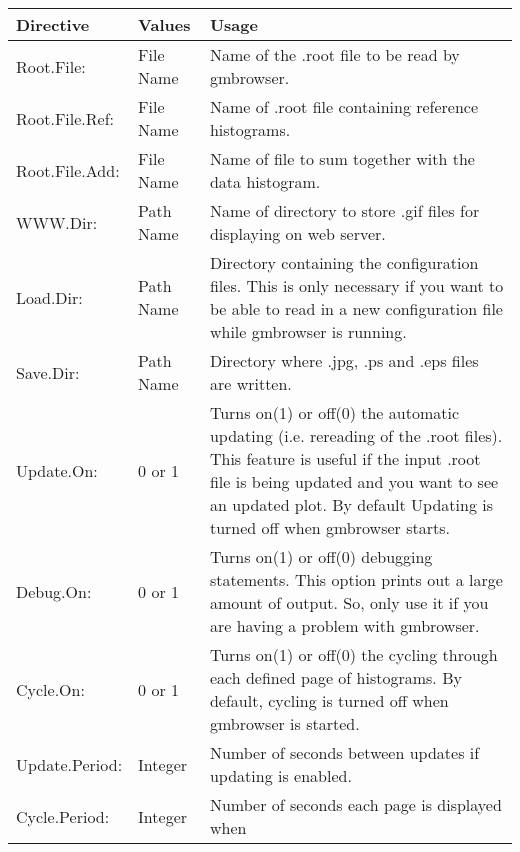 \documentclass[12pt]{article}
\begin{document}
\begin{table}
\begin{tabular}{llp{3.5in}}
\hline\hline
Directive & Values & Usage \\ \hline
  Root.File:     & File Name & Name of the .root file to be read by 
                               gmbrowser.\\
  Root.File.Ref: & File Name & Name of .root file containing reference 
                               histograms.\\
  Root.File.Add: & File Name & Name of file to sum together with the data
                               histogram.\\
  WWW.Dir:       & Path Name & Name of directory to store .gif files for 
      displaying on web server.\\
  Load.Dir:      & Path Name & Directory containing the configuration files.
                               This is only necessary if you want to be 
                               able to read in a new configuration file 
                               while gmbrowser is running.\\
  Save.Dir:      & Path Name & Directory where .jpg, .ps and .eps files 
                               are written.\\
  Update.On:     & 0 or 1    & Turns on(1) or off(0) the automatic 
                               updating (i.e. rereading of the .root files). 
                               This feature is useful if the input .root file
                               is being updated and you want to see an updated 
                               plot. By default Updating is turned off when 
                               gmbrowser starts.\\
  Debug.On:      & 0 or 1    & Turns on(1) or off(0) debugging statements. 
                               This option prints out a large amount of output.
                               So, only use it if you are having a problem 
                               with gmbrowser. \\
  Cycle.On:      & 0 or 1    & Turns on(1) or off(0) the cycling through each
                               defined page of histograms. By default, cycling 
                               is turned off when gmbrowser is started. \\
  Update.Period: & Integer   & Number of seconds between updates if updating
                               is enabled.\\
  Cycle.Period:  & Integer   & Number of seconds each page is displayed when

\end{tabular}
\end{table}
\end{document}
